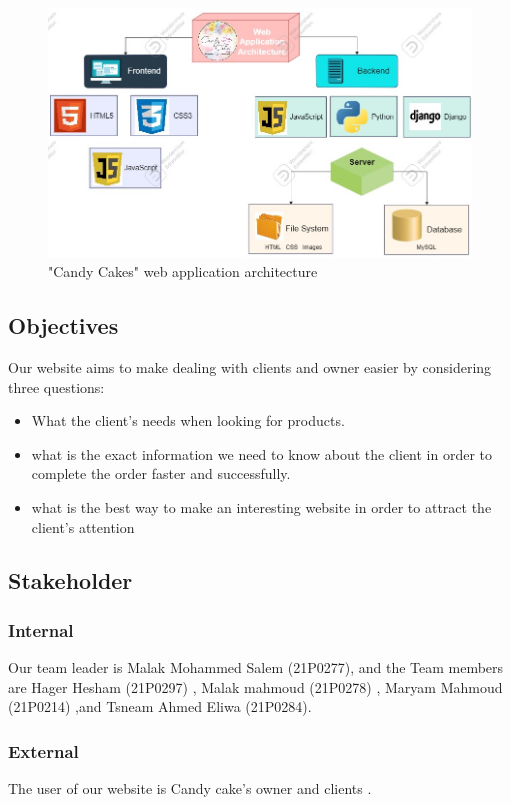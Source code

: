 \documentclass[hidelinks,a4paper,12pt]{article}
\begin{document}
\begin{figure}[h]
\centering
\includegraphics[width=0.8\linewidth]{./Arch.jpg}
\caption{"Candy Cakes" web application architecture}
\label{fig:overview}
\end{figure}




\subsection{Objectives}
Our website aims to make dealing with clients and owner easier by considering three questions:
\begin{itemize}
\item  What the client's needs when looking for products.
\item  what is the exact information we need to know about the client in order to complete the order faster and successfully.
\item  what is the best way to make an interesting website in order to attract the client's attention 
\end{itemize}
\subsection{Stakeholder}
\subsubsection{Internal}
Our team leader is Malak Mohammed Salem (21P0277), and the 
Team members are 
Hager Hesham (21P0297) ,
Malak mahmoud (21P0278) ,
Maryam Mahmoud (21P0214) ,and
Tsneam Ahmed Eliwa (21P0284).

\subsubsection{External}
The user of our website is Candy cake's owner and clients .
\end{document}
